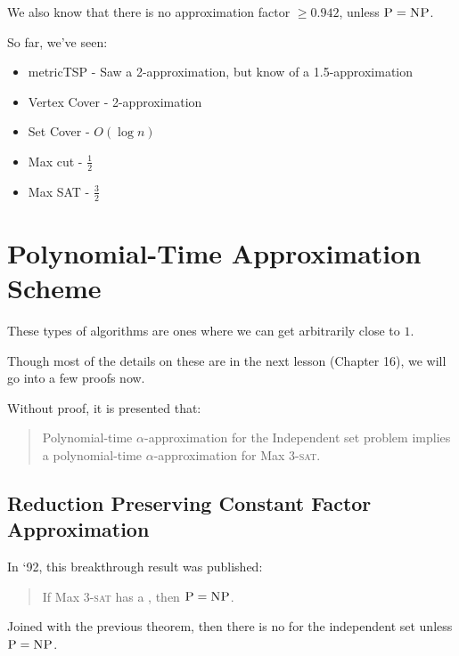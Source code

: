                 We also know that there is no approximation factor $\ge 0.942$, unless $\textsc{P} = \textsc{NP}$.

                So far, we've seen:
                \begin{itemize}
                    \item metricTSP - Saw a 2-approximation, but know of a 1.5-approximation
                    \item Vertex Cover - 2-approximation
                    \item Set Cover - $O(\log n)$
                    \item Max cut - $\frac{1}{2}$
                    \item Max SAT - $\frac{3}{2}$
                \end{itemize}
            \section{Polynomial-Time Approximation Scheme} %
            \label{sec:polynomial_time_approximation_scheme}
                These types of algorithms are ones where we can get arbitrarily close to $1$.

                Though most of the details on these are in the next lesson (Chapter 16), we will go into a few proofs now.

                Without proof, it is presented that:
                \begin{quotation}
                    Polynomial-time $\alpha$-approximation for the Independent set problem implies a polynomial-time $\alpha$-approximation for Max 3-\textsc{sat}.
                \end{quotation}

                \subsection{Reduction Preserving Constant Factor Approximation} %
                \label{sub:reduction_preserving_constant_factor_approximation}
                    In `92, this breakthrough result was published:
                    \begin{quotation}
                        If Max 3-\textsc{sat} has a \ptas, then $\textsc{P} = \textsc{NP}$.
                    \end{quotation}
                    Joined with the previous theorem, then there is no \ptas for the independent set unless $\textsc{P} = \textsc{NP}$.

